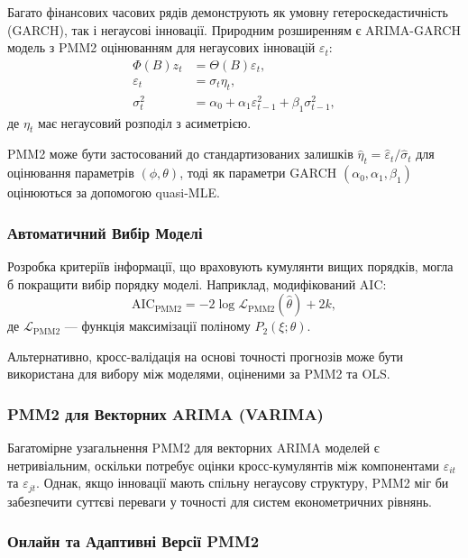 \documentclass[12pt,a4paper]{article}
\begin{document}
Багато фінансових часових рядів демонструють як умовну гетероскедастичність (GARCH), так і негаусові інновації. Природним розширенням є ARIMA-GARCH модель з PMM2 оцінюванням для негаусових інновацій $\varepsilon_t$:
\begin{align}
    \Phi(B) z_t &= \Theta(B) \varepsilon_t, \\
    \varepsilon_t &= \sigma_t \eta_t, \\
    \sigma_t^2 &= \alpha_0 + \alpha_1 \varepsilon_{t-1}^2 + \beta_1 \sigma_{t-1}^2,
\end{align}
де $\eta_t$ має негаусовий розподіл з асиметрією.

PMM2 може бути застосований до стандартизованих залишків $\hat{\eta}_t = \hat{\varepsilon}_t / \hat{\sigma}_t$ для оцінювання параметрів $(\phi, \theta)$, тоді як параметри GARCH $(\alpha_0, \alpha_1, \beta_1)$ оцінюються за допомогою quasi-MLE.

\subsubsection{Автоматичний Вибір Моделі}

Розробка критеріїв інформації, що враховують кумулянти вищих порядків, могла б покращити вибір порядку моделі. Наприклад, модифікований AIC:
\begin{equation}
    \text{AIC}_{\text{PMM2}} = -2 \log \mathcal{L}_{\text{PMM2}}(\hat{\theta}) + 2k,
\end{equation}
де $\mathcal{L}_{\text{PMM2}}$ --- функція максимізації поліному $P_2(\xi; \theta)$.

Альтернативно, кросс-валідація на основі точності прогнозів може бути використана для вибору між моделями, оціненими за PMM2 та OLS.

\subsubsection{PMM2 для Векторних ARIMA (VARIMA)}

Багатомірне узагальнення PMM2 для векторних ARIMA моделей є нетривіальним, оскільки потребує оцінки кросс-кумулянтів між компонентами $\varepsilon_{it}$ та $\varepsilon_{jt}$. Однак, якщо інновації мають спільну негаусову структуру, PMM2 міг би забезпечити суттєві переваги у точності для систем економетричних рівнянь.

\subsubsection{Онлайн та Адаптивні Версії PMM2}
\end{document}
